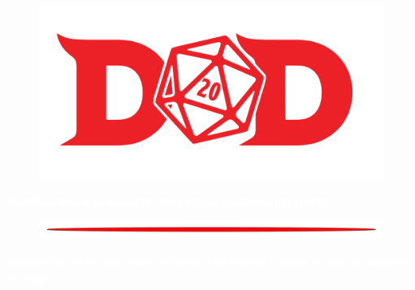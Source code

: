 \documentclass[a4paper, 9pt, twocolumn]{book}
\begin{document}
	\begin{titlepage}
		\begin{center}
			\begin{figure}[H]
				\centering
				\includegraphics[scale=0.2]{DnD_logo}
			\end{figure}
			{\fontsize{30pt}{0pt}\textcolor{white}{\textbf{Всеобъемлющее руководство по сбору и созданию предметов}}}
			
			\begin{figure}[H]
				\centering
				\includegraphics[scale=0.2]{Arrow}
			\end{figure}			
			
				\vskip 13cm
				
			{\Large{\textcolor{white}{Руководство по системе сбора и создания предметов в одной из лучших ролевых игр мира}}}
			
		\end{center}
	\end{titlepage}
\end{document}

